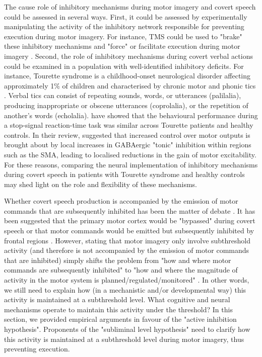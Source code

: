 \documentclass[utf8]{template/frontiersSCNS} %
\begin{document}
The cause role of inhibitory mechanisms during motor imagery and covert speech could be assessed in several ways. First, it could be assessed by experimentally manipulating the activity of the inhibitory network responsible for preventing execution during motor imagery. For instance, TMS could be used to "brake" these inhibitory mechanisms and "force" or facilitate execution during motor imagery \citep[e.g.,][]{angelini_motor_2015, angelini_proactive_2016}. Second, the role of inhibitory mechanisms during covert verbal actions could be examined in a population with well-identified inhibitory deficits. For instance, Tourette syndrome is a childhood-onset neurological disorder affecting approximately 1\% of children and characterised by chronic motor and phonic tics \citep{jackson_inhibition_2015}. Verbal tics can consist of repeating sounds, words, or utterances (palilalia), producing inappropriate or obscene utterances (coprolalia), or the repetition of another’s words (echolalia). \cite{ganos_action_2014} have showed that the behavioural performance during a stop-signal reaction-time task was similar across Tourette patients and healthy controls. In their review, \cite{jackson_inhibition_2015} suggested that increased control over motor outputs is brought about by local increases in GABAergic "tonic" inhibition within regions such as the SMA, leading to localised reductions in the gain of motor excitability. For these reasons, comparing the neural implementation of inhibitory mechanisms during covert speech in patients with Tourette syndrome and healthy controls may shed light on the role and flexibility of these mechanisms.


Whether covert speech production is accompanied by the emission of motor commands that are subsequently inhibited has been the matter of debate \citep[e.g.,][]{geva_inner_2018}. It has been suggested that the primary motor cortex would be "bypassed" during covert speech  \citep[e.g.,][]{tian_mental_2012, tian_effect_2013, tian_mental_2016} or that motor commands would be emitted but subsequently inhibited by frontal regions \citep[e.g.,][]{loevenbruck_cognitive_2018}. However, stating that motor imagery only involve subthreshold activity (and therefore is not accompanied by the emission of motor commands that are inhibited) simply shifts the problem from "how and where motor commands are subsequently inhibited" to "how and where the magnitude of activity in the motor system is planned/regulated/monitored" \citep[see also][]{scheil_motor_2018}. In other words, we still need to explain how (in a mechanistic and/or developmental way) this activity is maintained at a subthreshold level. What cognitive and neural mechanisms operate to maintain this activity under the threshold? In this section, we provided empirical arguments in favour of the "active inhibition hypothesis". Proponents of the "subliminal level hypothesis" need to clarify how this activity is maintained at a subthreshold level during motor imagery, thus preventing execution.
\end{document}
